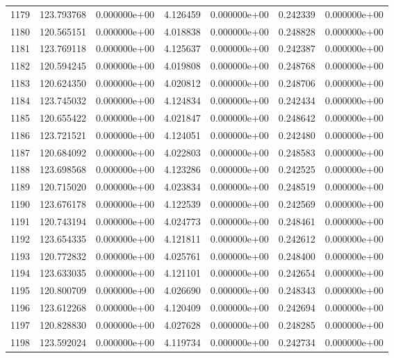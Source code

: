 \begin{tabular}{rrrrrrr}
1179 & 123.793768 &  0.000000e+00 &  4.126459 &  0.000000e+00 &    0.242339 &  0.000000e+00 \\
1180 & 120.565151 &  0.000000e+00 &  4.018838 &  0.000000e+00 &    0.248828 &  0.000000e+00 \\
1181 & 123.769118 &  0.000000e+00 &  4.125637 &  0.000000e+00 &    0.242387 &  0.000000e+00 \\
1182 & 120.594245 &  0.000000e+00 &  4.019808 &  0.000000e+00 &    0.248768 &  0.000000e+00 \\
1183 & 120.624350 &  0.000000e+00 &  4.020812 &  0.000000e+00 &    0.248706 &  0.000000e+00 \\
1184 & 123.745032 &  0.000000e+00 &  4.124834 &  0.000000e+00 &    0.242434 &  0.000000e+00 \\
1185 & 120.655422 &  0.000000e+00 &  4.021847 &  0.000000e+00 &    0.248642 &  0.000000e+00 \\
1186 & 123.721521 &  0.000000e+00 &  4.124051 &  0.000000e+00 &    0.242480 &  0.000000e+00 \\
1187 & 120.684092 &  0.000000e+00 &  4.022803 &  0.000000e+00 &    0.248583 &  0.000000e+00 \\
1188 & 123.698568 &  0.000000e+00 &  4.123286 &  0.000000e+00 &    0.242525 &  0.000000e+00 \\
1189 & 120.715020 &  0.000000e+00 &  4.023834 &  0.000000e+00 &    0.248519 &  0.000000e+00 \\
1190 & 123.676178 &  0.000000e+00 &  4.122539 &  0.000000e+00 &    0.242569 &  0.000000e+00 \\
1191 & 120.743194 &  0.000000e+00 &  4.024773 &  0.000000e+00 &    0.248461 &  0.000000e+00 \\
1192 & 123.654335 &  0.000000e+00 &  4.121811 &  0.000000e+00 &    0.242612 &  0.000000e+00 \\
1193 & 120.772832 &  0.000000e+00 &  4.025761 &  0.000000e+00 &    0.248400 &  0.000000e+00 \\
1194 & 123.633035 &  0.000000e+00 &  4.121101 &  0.000000e+00 &    0.242654 &  0.000000e+00 \\
1195 & 120.800709 &  0.000000e+00 &  4.026690 &  0.000000e+00 &    0.248343 &  0.000000e+00 \\
1196 & 123.612268 &  0.000000e+00 &  4.120409 &  0.000000e+00 &    0.242694 &  0.000000e+00 \\
1197 & 120.828830 &  0.000000e+00 &  4.027628 &  0.000000e+00 &    0.248285 &  0.000000e+00 \\
1198 & 123.592024 &  0.000000e+00 &  4.119734 &  0.000000e+00 &    0.242734 &  0.000000e+00 \\

\end{tabular}
